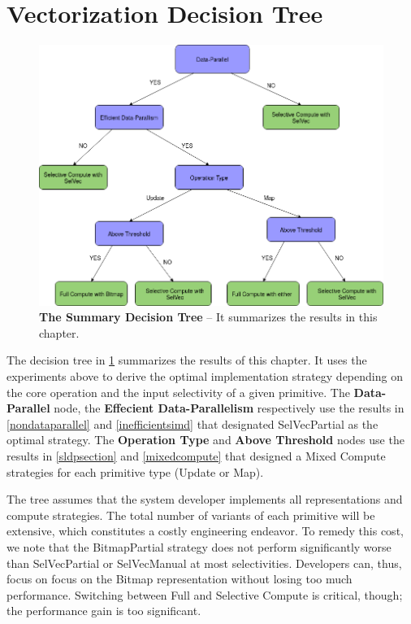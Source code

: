 \documentclass[12pt]{cmuthesis}
\begin{document}
\section{Vectorization Decision Tree}
\begin{figure}[t!]
    \centering
    \includegraphics[scale=0.5]{images/DecisionTree.png}
    \caption{\textbf{The Summary Decision Tree} -- It summarizes the results in this chapter.}
    \label{fig:filter_decision_tree}
\end{figure}

The decision tree in \cref{fig:filter_decision_tree} summarizes the results of this chapter. It uses the experiments above to derive the optimal implementation strategy depending on the core operation and the input selectivity of a given primitive. The \textbf{Data-Parallel} node, the \textbf{Effecient Data-Parallelism} respectively use the results in \cref{nondataparallel} and \cref{inefficientsimd} that designated SelVecPartial as the optimal strategy. The \textbf{Operation Type} and \textbf{Above Threshold} nodes use the results in \cref{sldpsection} and \cref{mixedcompute} that designed a Mixed Compute strategies for each primitive type (Update or Map).


The tree assumes that the system developer implements all representations and compute strategies. The total number of variants of each primitive will be extensive, which constitutes a costly engineering endeavor. To remedy this cost, we note that the BitmapPartial strategy does not perform significantly worse than SelVecPartial or SelVecManual at most selectivities. Developers can, thus, focus on focus on the Bitmap representation without losing too much performance. Switching between Full and Selective Compute is critical, though; the performance gain is too significant.
\end{document}
